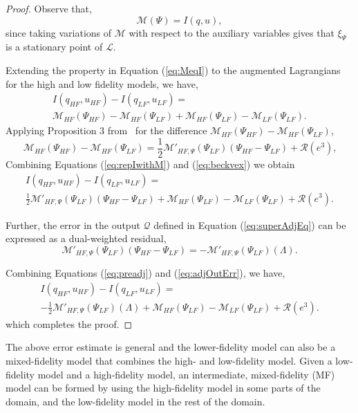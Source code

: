 \begin{proof}
%
Observe that,
%
\begin{equation}
\label{eq:MeqI}
\mathcal{M}(\Psi)=I(q,u),
\end{equation}
%
since taking variations of $\mathcal{M}$ with respect to the auxiliary variables gives that $\xi_\Psi$ is a stationary point of $\mathcal{L}$.

Extending the property in Equation (\ref{eq:MeqI}) to the augmented Lagrangians for the high and low fidelity models, we have,
%
\begin{multline}
\label{eq:repIwithM}
I(q_{HF},u_{HF})-I(q_{LF},u_{LF})=\\\mathcal{M}_{HF}(\Psi_{HF})-\mathcal{M}_{HF}(\Psi_{LF})+\mathcal{M}_{HF}(\Psi_{LF})-\mathcal{M}_{LF}(\Psi_{LF})\textrm{.}
\end{multline}
%
Applying Proposition 3 from~\cite{BecVex05} for the difference $\mathcal{M}_{HF}(\Psi_{HF})-\mathcal{M}_{HF}(\Psi_{LF})$,
\begin{equation}
\label{eq:beckvex}
\mathcal{M}_{HF}(\Psi_{HF})-\mathcal{M}_{HF}(\Psi_{LF}) = \frac{1}{2}\mathcal{M}'_{HF,\Psi}(\Psi_{LF})(\Psi_{HF}-\Psi_{LF})+\mathcal{R}(e^3)\textrm{,}
\end{equation}
Combining Equations (\ref{eq:repIwithM}) and (\ref{eq:beckvex}) we obtain
\begin{multline}
\label{eq:preadj}
I(q_{HF},u_{HF})-I(q_{LF},u_{LF})=\\\frac{1}{2}\mathcal{M}'_{HF,\Psi}(\Psi_{LF})(\Psi_{HF}-\Psi_{LF})+\mathcal{M}_{HF}(\Psi_{LF})-\mathcal{M}_{LF}(\Psi_{LF})+\mathcal{R}(e^3)\textrm{.}
\end{multline}

Further, the error in the output $\mathcal{Q}$ defined in Equation (\ref{eq:superAdjEq}) can be expressed as a dual-weighted residual,
\begin{equation}
\label{eq:adjOutErr}
\mathcal M'_{HF,\Psi}(\Psi_{LF})(\Psi_{HF}-\Psi_{LF})=-\mathcal{M}'_{HF,\Psi}(\Psi_{LF})(\Lambda).
\end{equation}

Combining Equations (\ref{eq:preadj}) and (\ref{eq:adjOutErr}), we have,
\begin{multline}
I(q_{HF},u_{HF})-I(q_{LF},u_{LF})=\\-\frac{1}{2}\mathcal{M}'_{HF,\Psi}(\Psi_{LF})(\Lambda)+\mathcal M_{HF}(\Psi_{LF})-\mathcal M_{LF}(\Psi_{LF})+\mathcal{R}(e^3). \nonumber
\end{multline}
%
which completes the proof.
\end{proof}
%
The above error estimate is general and the lower-fidelity model can also be a mixed-fidelity model that combines the high- and low-fidelity model. Given a low-fidelity model and a high-fidelity model, an intermediate, mixed-fidelity (MF) model can be formed by using the high-fidelity model in some parts of the domain, and the low-fidelity model in the rest of the domain.
